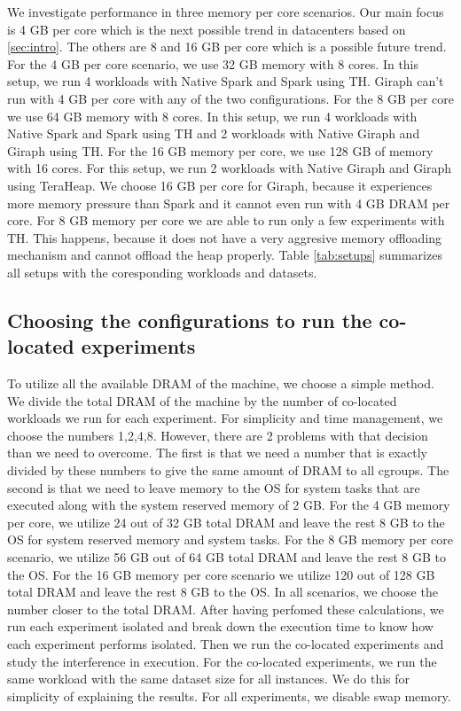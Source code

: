 We investigate performance in three memory per core scenarios. Our main focus is 4 GB per core 
which is the next possible trend in datacenters based on \ref{sec:intro}. The others
are 8 and 16 GB per core which is a possible future trend. For the 4 GB per core scenario, we use 32 GB memory with 8 cores.
In this setup, we run 4 workloads with Native Spark and Spark using TH. Giraph can't run with 4 GB per core with any of the two
configurations.
For the 8 GB per core we use 64 GB memory with 8 cores. 
In this setup, we run 4 workloads with Native Spark and Spark using TH and 2 workloads with Native Giraph and Giraph using TH. For the 16 GB memory per core, we use 128 GB of memory with 16 cores. For this setup, we run 2 workloads with Native Giraph and Giraph using TeraHeap. We choose 16 GB per core for Giraph, because it experiences more memory pressure than Spark and it cannot even run with 4 GB DRAM per core. For 8 GB memory per core we are able to run only a few experiments with TH. This happens, because it does not have a very aggresive memory offloading mechanism and cannot offload the heap properly. Table \ref{tab:setups} summarizes all setups with the coresponding workloads and datasets.

\subsection{Choosing the configurations to run the co-located experiments}
To utilize all the available DRAM of the machine, we choose a simple method. 
We divide the total DRAM of the machine by the number of co-located workloads we run for each experiment.
For simplicity and time management, we choose the numbers 1,2,4,8. However, there are 2 problems with that decision
than we need to overcome. The first is that we need a number that is exactly divided by these numbers to give the same amount of DRAM to
all cgroups. The second is that we need to leave memory to the OS for system tasks that are executed along with the system reserved memory of 2 GB. For the 4 GB memory per core, we utilize 24 out of 32 GB total DRAM and leave the rest 8 GB to the OS for system reserved memory and system tasks. For the 8 GB memory per core scenario, we utilize 56 GB out of 64 GB total DRAM and leave the rest 8 GB to the OS. For the 16 GB memory per core scenario we utilize 120 out of 128 GB total DRAM and leave the rest 8 GB to the OS. 
In all scenarios, we choose the number closer to the total DRAM. After having perfomed these calculations, we run each experiment isolated and break down the execution time to know how each experiment performs isolated. Then we run the co-located experiments and study the interference in execution. For the co-located experiments, we run the same workload with the same dataset size for all instances. We do this for simplicity of explaining the results. For all experiments, we disable swap memory.

